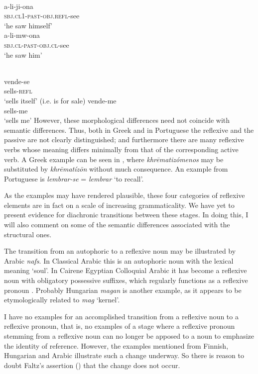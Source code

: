 \ea\label{ex:E19}
\langinfo{\LangSwah}{}{} \\
 \ea
 \gll a-li-ji-ona  \\
\textsc{sbj}.\textsc{cl}1-\textsc{past}-\textsc{obj}.\textsc{refl}-see\\
\glt ‘he saw himself’\\
\ex
\gll a-li-mw-ona \\
 \textsc{sbj}.\textsc{cl}-\textsc{past}-\textsc{obj}.\textsc{cl}-see \\
 \glt ‘he saw him’\\
\z
\z


\ea\label{ex:E20}
\langinfo{\LangPort}{}{}  \\
 \ea
 \gll vende-se  \\
 sells-\textsc{refl}  \\
\glt ‘sells itself’ (i.e. is for sale)
\ex 
\gll vende-me \\
sells-me \\
\glt ‘sells me’
\z
\z
\noindent However, these morphological differences need not coincide with semantic differences. Thus, both in Greek and in Portuguese the reflexive and the passive are not clearly distinguished; and furthermore there are many reflexive verbs whose meaning differs minimally from that of the corresponding active verb. A Greek example can be seen in , where \textit{khr\=ematizómenos} may be substituted by \textit{khrēmatízōn} without much consequence. An example from Portuguese is \textit{lembrar-se} = \textit{lembrar} ‘to recall’.

As the examples may have rendered plausible, these four categories of reflexive elements are in fact on a scale of increasing grammaticality. We have yet to present evidence for diachronic transitions between these stages. In doing this, I will also comment on some of the semantic differences associated with the structural ones.

The transition from an autophoric to a reflexive noun may be illustrated by Arabic \textit{nafs}. In Classical Arabic this is an autophoric noun with the lexical meaning ‘soul’. In Cairene Egyptian Colloquial Arabic it has become a reflexive noun with obligatory possessive suffixes, which regularly functions as a reflexive pronoun \citep[80f]{GaryEtAl1982}. Probably Hungarian \textit{magan} is another example, as it appears to be etymologically related to \textit{mag} ‘kernel’.

I have no examples for an accomplished transition from a reflexive noun to a reflexive pronoun, that is, no examples of a stage where a reflexive pronoun stemming from a reflexive noun can no longer be apposed to a noun to emphasize the identity of reference. However, the examples mentioned from Finnish, Hungarian and Arabic illustrate such a change underway. So there is reason to doubt Faltz's assertion (\citeyear[236--238]{Faltz1977}) that the change does not occur.

